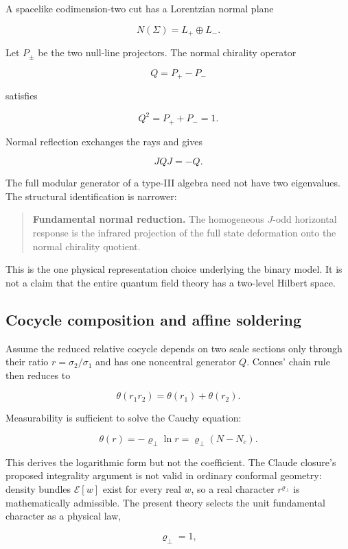 \documentclass[
  11pt,
  letterpaper,
]{article}
\begin{document}
A spacelike codimension-two cut has a Lorentzian normal plane

\[
N(\Sigma)=L_+\oplus L_-.
\]

Let \(P_\pm\) be the two null-line projectors. The normal chirality
operator

\[
Q=P_+-P_-
\]

satisfies

\[
Q^2=P_++P_-=1.
\]

Normal reflection exchanges the rays and gives

\[
JQJ=-Q.
\]

The full modular generator of a type-III algebra need not have two
eigenvalues. The structural identification is narrower:

\begin{quote}
\textbf{Fundamental normal reduction.} The homogeneous \(J\)-odd
horizontal response is the infrared projection of the full state
deformation onto the normal chirality quotient.
\end{quote}

This is the one physical representation choice underlying the binary
model. It is not a claim that the entire quantum field theory has a
two-level Hilbert space.

\subsection{Cocycle composition and affine
soldering}\label{cocycle-composition-and-affine-soldering}

Assume the reduced relative cocycle depends on two scale sections only
through their ratio \(r=\sigma_2/\sigma_1\) and has one noncentral
generator \(Q\). Connes' chain rule then reduces to

\[
\theta(r_1r_2)=\theta(r_1)+\theta(r_2).
\]

Measurability is sufficient to solve the Cauchy equation:

\[
\boxed{
\theta(r)=-\varrho_\perp\ln r
=\varrho_\perp(N-N_c).
}
\]

This derives the logarithmic form but not the coefficient. The Claude
closure's proposed integrality argument is not valid in ordinary
conformal geometry: density bundles \(\mathcal E[w]\) exist for every
real \(w\), so a real character \(r^{\varrho_\perp}\) is mathematically
admissible. The present theory selects the unit fundamental character as
a physical law,

\[
\boxed{\varrho_\perp=1,}
\]
\end{document}
